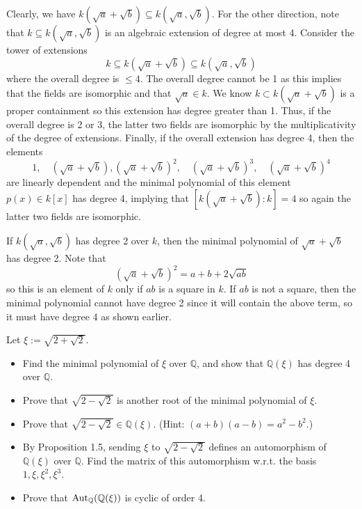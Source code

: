 \documentclass[../../master.tex]{subfiles}
\begin{document}
\begin{solution}
    Clearly, we have $k(\sqrt{a} + \sqrt{b}) \subseteq k(\sqrt{a}, \sqrt{b})$.
    For the other direction, note that $k \subseteq k(\sqrt{a}, \sqrt{b})$ is an algebraic extension of degree at most 4.
    Consider the tower of extensions 
    \[
    k \subseteq k(\sqrt{a} + \sqrt{b}) \subseteq k(\sqrt{a}, \sqrt{b})
    \]
    where the overall degree is $\leq 4$.
    The overall degree cannot be 1 as this implies that the fields are isomorphic and that $\sqrt{a} \in k$.
    We know $k \subset k(\sqrt{a} + \sqrt{b})$ is a proper containment so this extension has degree greater than 1.
    Thus, if the overall degree is 2 or 3, the latter two fields are isomorphic by the multiplicativity of the degree of extensions.
    Finally, if the overall extension has degree 4, then the elements
    \[
        1, \quad (\sqrt{a} + \sqrt{b}), (\sqrt{a} + \sqrt{b})^2, \quad (\sqrt{a} + \sqrt{b})^3, \quad (\sqrt{a} + \sqrt{b})^{4}
    \]
    are linearly dependent and the minimal polynomial of this element $p(x) \in k[x]$ has degree 4, implying that $[k(\sqrt{a} + \sqrt{b}) : k] = 4$ so again the latter two fields are isomorphic.

    If $k(\sqrt{a}, \sqrt{b})$ has degree 2 over $k$, then the minimal polynomial of $\sqrt{a} + \sqrt{b}$ has degree 2.
    Note that
    \[
        (\sqrt{a} + \sqrt{b})^2 = a + b + 2\sqrt{ab}
    \]
    so this is an element of $k$ only if $ab$ is a square in $k$.
    If $ab$ is not a square, then the minimal polynomial cannot have degree 2 since it will contain the above term, so it must have degree 4 as shown earlier.
\end{solution}

\begin{problem}
    Let $\xi := \sqrt{2 + \sqrt{2}}$.
    \begin{itemize}
        \item Find the minimal polynomial of $\xi$ over $\mathbb{Q}$, and show that $\mathbb{Q}(\xi)$ has degree 4 over $\mathbb{Q}$.
        \item Prove that $\sqrt{2 - \sqrt{2}}$ is another root of the minimal polynomial of $\xi$.
        \item Prove that $\sqrt{2 - \sqrt{2}} \in \mathbb{Q}(\xi)$.
            (Hint: $(a + b)(a - b) = a^2 - b^2$.)
        \item By Proposition 1.5, sending $\xi$ to $\sqrt{2 - \sqrt{2}}$ defines an automorphism of $\mathbb{Q}(\xi)$ over $\mathbb{Q}$.
            Find the matrix of this automorphism w.r.t. the basis $1, \xi, \xi^2, \xi^3$.
        \item Prove that $\operatorname{Aut}_{\mathbb{Q}}(\mathbb{Q}(\xi))$ is cyclic of order 4.
    \end{itemize}
\end{problem}
\end{document}
